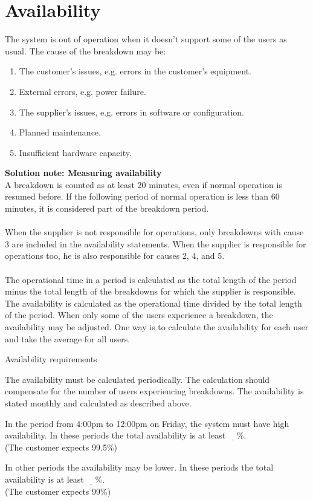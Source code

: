 \documentclass[Main]{subfiles}
\begin{document}
\section{Availability}

The system is out of operation when it doesn't support some of the users as usual. 
The cause of the breakdown may be: 

\begin{enumerate}

\item The customer's issues, e.g. errors in the customer's equipment.

\item External errors, e.g. power failure.

\item The supplier's issues, e.g. errors in software or configuration.

\item Planned maintenance.

\item Insufficient hardware capacity.

\end{enumerate}
\textbf{Solution note: Measuring availability}\\
A breakdown is counted as at least 20 minutes, even if normal operation is resumed before. 
If the following period of normal operation is less than 60 minutes, it is considered part of the breakdown period.
\\
\\
When the supplier is not responsible for operations, only breakdowns with cause 3 are included in the availability statements. 
When the supplier is responsible for operations too, he is also responsible for causes 2, 4, and 5.
\\
\\
The operational time in a period is calculated as the total length of the period minus the total length of the breakdowns for which the supplier is responsible. 
The availability is calculated as the operational time divided by the total length of the period. When only some of the users experience a breakdown, the availability may be adjusted. 
One way is to calculate the availability for each user and take the average for all users. 

\begin{DynTable}{Availability requirements}

\Doc
{The availability must be calculated periodically. 
The calculation should compensate for the number of users experiencing breakdowns. }
{The availability is stated monthly and calculated as described above.}
{}

\Doc
{In the period from 4:00pm to 12:00pm on Friday, the system must have high availability.}
{In these periods the total availability is at least $\underline{\quad}$\%. \\
(The customer expects 99.5\%)}

\Doc
{In other periods the availability may be lower.}
{In these periods the total availability is at least $\underline{\quad}$\%. \\
(The customer expects 99\%)}
{}


\end{DynTable}
\end{document}
